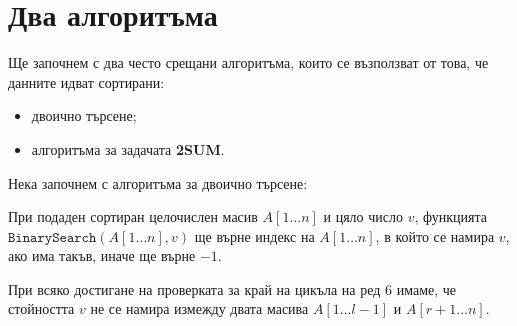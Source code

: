 \section{Два алгоритъма}

Ще започнем с два често срещани алгоритъма, които се възползват от това, че данните идват сортирани:
\begin{itemize}
    \item двоично търсене;
    \item алгоритъма за задачата \textbf{2SUM}.
\end{itemize}

Нека започнем с алгоритъма за двоично търсене:


При подаден сортиран целочислен масив $A[1 \dots n]$ и цяло число $v$, функцията $\mathtt{BinarySearch}(A[1 \dots n], v)$ ще върне индекс на $A[1 \dots n]$, в който се намира $v$, ако има такъв, иначе ще върне $-1$.

\begin{invariant}
    При всяко достигане на проверката за край на цикъла на ред $6$ имаме, че стойността $v$ не се намира измежду двата масива $A[1 \dots l - 1]$ и $A[r + 1 \dots n]$.
\end{invariant}

